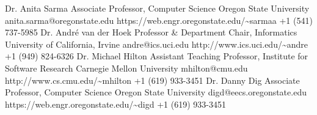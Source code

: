 \documentclass[localFont,alternative]{yaac-another-awesome-cv}
\begin{document}

\begin{references}
		{Dr. Anita Sarma}
		{Associate Professor, Computer Science}
		{Oregon State University}
		{anita.sarma@oregonstate.edu}
		{https://web.engr.oregonstate.edu/\textasciitilde sarmaa}
		{+1 (541) 737-5985}
		{Dr. André van der Hoek}
		{Professor \& Department Chair, Informatics}
		{University of California, Irvine}
		{andre@ics.uci.edu}
		{http://www.ics.uci.edu/\textasciitilde andre}
		{+1 (949) 824-6326}
    \newline{}
        {Dr. Michael Hilton}
        {Assistant Teaching Professor, Institute for Software Research}
        {Carnegie Mellon University}
        {mhilton@cmu.edu}
        {http://www.cs.cmu.edu/\textasciitilde mhilton}
        {+1 (619) 933-3451}
        {Dr. Danny Dig}
        {Associate Professor, Computer Science}
        {Oregon State University}
        {digd@eecs.oregonstate.edu}
        {https://web.engr.oregonstate.edu/\textasciitilde digd}
        {+1 (619) 933-3451}
\end{references}

%	
\end{document}
